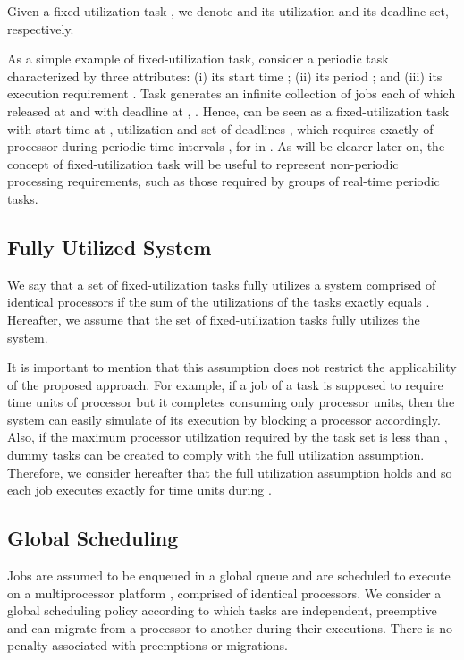 \documentclass[twocolumn, compsocconf]{IEEEtran}
\newcounter{proc}
\begin{document}
Given a fixed-utilization task , we denote  and
 its utilization and its deadline set, respectively.


As a simple example of fixed-utilization task, consider a periodic task 
characterized by three attributes: (i) its start time ; (ii) its period
; and (iii) its execution requirement . Task  generates an infinite
collection of jobs each of which released at  and with deadline at
, . Hence,  can be seen as a fixed-utilization task
with start time at , utilization  and set of deadlines
, which requires exactly
 of processor during periodic time intervals , for  in .  As will be clearer later on, the concept of
fixed-utilization task will be useful to represent non-periodic processing
requirements, such as those required by groups of real-time periodic tasks.


\subsection{Fully Utilized System}
\label{sec:fullyUtilSyst}

We say that a set of  fixed-utilization tasks fully utilizes a system
comprised of  identical processors if the sum of the utilizations of the 
tasks exactly equals . Hereafter, we assume that the set of 
fixed-utilization tasks fully utilizes the system.

It is important to mention that this assumption does not restrict the
applicability of the proposed approach.  For example, if a job  of a task is
supposed to require  time units of processor but it completes consuming
only  processor units, then the system can easily simulate 
of its execution by blocking a processor accordingly. Also, if the maximum
processor utilization required by the task set is less than , dummy tasks can
be created to comply with the full utilization assumption. Therefore, we
consider hereafter that the full utilization assumption holds and so each job
 executes exactly for  time units during .


\subsection{Global Scheduling} 

Jobs are assumed to be enqueued in a global queue and are scheduled to execute
on a multiprocessor platform , comprised of  identical
processors. We consider a global scheduling policy according to which tasks are
independent, preemptive and can migrate from a processor to another during their
executions. There is no penalty associated with preemptions or migrations.
\end{document}
